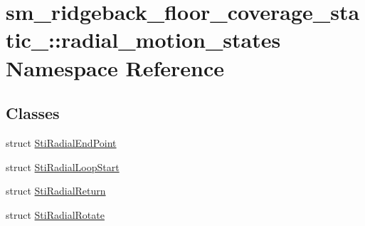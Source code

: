 \hypertarget{namespacesm__ridgeback__floor__coverage__static__1_1_1radial__motion__states}{}\section{sm\+\_\+ridgeback\+\_\+floor\+\_\+coverage\+\_\+static\+\_\+:\+:radial\+\_\+motion\+\_\+states Namespace Reference}
\label{namespacesm__ridgeback__floor__coverage__static__1_1_1radial__motion__states}
\subsection*{Classes}
\begin{DoxyCompactItemize}
\item 
struct \hyperlink{structsm__ridgeback__floor__coverage__static__1_1_1radial__motion__states_1_1StiRadialEndPoint}{Sti\+Radial\+End\+Point}
\item 
struct \hyperlink{structsm__ridgeback__floor__coverage__static__1_1_1radial__motion__states_1_1StiRadialLoopStart}{Sti\+Radial\+Loop\+Start}
\item 
struct \hyperlink{structsm__ridgeback__floor__coverage__static__1_1_1radial__motion__states_1_1StiRadialReturn}{Sti\+Radial\+Return}
\item 
struct \hyperlink{structsm__ridgeback__floor__coverage__static__1_1_1radial__motion__states_1_1StiRadialRotate}{Sti\+Radial\+Rotate}
\end{DoxyCompactItemize}

